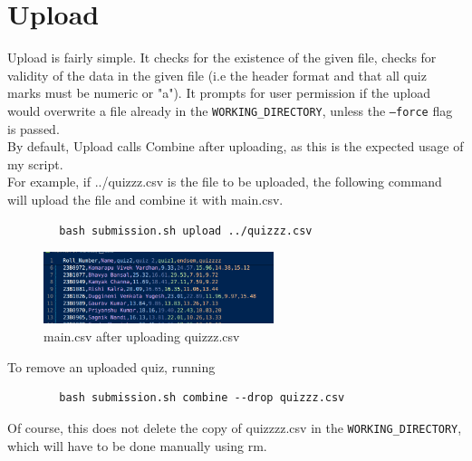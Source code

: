 \documentclass{article}
\begin{document}
    \section{Upload}
    Upload is fairly simple. It checks for the existence of the given file, checks for validity of the data in the given file (i.e the header format and that all quiz marks must be numeric or "a"). It prompts for user permission if the upload would overwrite a file already in the \texttt{WORKING\_DIRECTORY}, unless the \texttt{--force} flag is passed.\\
    By default, Upload calls Combine after uploading, as this is the expected usage of my script.\\
    For example, if ../quizzz.csv is the file to be uploaded, the following command will upload the file and combine it with main.csv.
    \begin{lstlisting}
        bash submission.sh upload ../quizzz.csv
    \end{lstlisting}
    \begin{figure}[htbp]
        \centering
        \includegraphics[width=0.6\textwidth]{Upload quizzz.png}
        \caption{main.csv after uploading quizzz.csv}
        \label{fig:upload}
    \end{figure}
    To remove an uploaded quiz, running
    \begin{lstlisting}
        bash submission.sh combine --drop quizzz.csv
    \end{lstlisting}
    Of course, this does not delete the copy of quizzzz.csv in the \texttt{WORKING\_DIRECTORY}, which will have to be done manually using rm.
\end{document}
